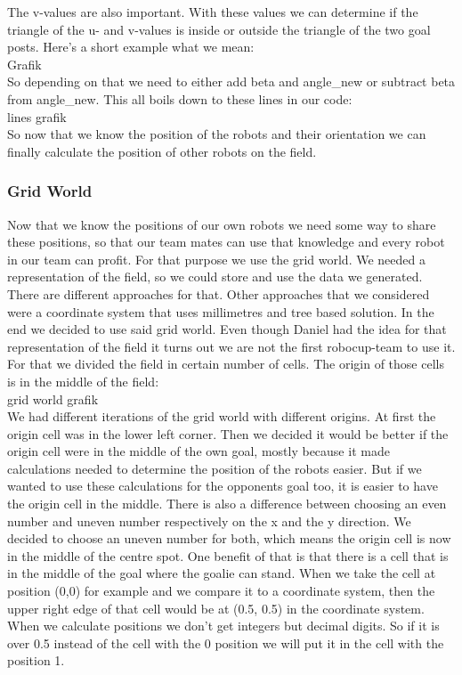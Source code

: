 \documentclass[lnicst,a4paper]{svmultln}
\begin{document}
The v-values are also important. With these values we can determine if the triangle of the u- and v-values is inside or outside the triangle of the two goal posts. Here's a short example what we mean:
\\
Grafik\\
So depending on that we need to either add beta and angle\_new or subtract beta from angle\_new. This all boils down to these lines in our code:\\
lines grafik\\
So now that we know the position of the robots and their orientation we can finally calculate the position of other robots on the field.



\subsubsection{Grid World}
Now that we know the positions of our own robots we need some way to share these positions, so that our team mates can use that knowledge and every robot in our team can profit. For that purpose we use the grid world. We needed a representation of the field, so we could store and use the data we generated. There are different approaches for that. Other approaches that we considered were a coordinate system that uses millimetres and tree based solution. In the end we decided to use said grid world. Even though Daniel had the idea for that representation of the field it turns out we are not the first robocup-team to use it. \cite{} For that we divided the field in certain number of cells. The origin of those cells is in the middle of the field:\\
grid world grafik\\
We had different iterations of the grid world with different origins. At first the origin cell was in the lower left corner. Then we decided it would be better if the origin cell were in the middle of the own goal, mostly because it made calculations needed to determine the position of the robots easier. But if we wanted to use these calculations for the opponents goal too, it is easier to have the origin cell in the middle. There is also a difference between choosing an even number and uneven number respectively on the x and the y direction. We decided to choose an uneven number for both, which means the origin cell is now in the middle of the centre spot. One benefit of that is that there is a cell that is in the middle of the goal where the goalie can stand. When we take the cell at position (0,0) for example and we compare it to a coordinate system, then the upper right edge of that cell would be at (0.5, 0.5) in the coordinate system. When we calculate positions we don't get integers but decimal digits. So if it is over 0.5 instead of the cell with the 0 position we will put it in the cell with the position 1. 
\end{document}
